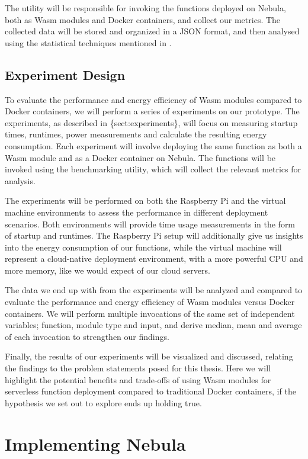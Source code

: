 \documentclass[
  table]{report}
\begin{document}
The utility will be responsible for invoking the functions deployed on
Nebula, both as \ac{Wasm} modules and Docker containers, and collect our
metrics. The collected data will be stored and organized in a JSON
format, and then analysed using the statistical techniques mentioned in
.

\section{Experiment Design}

To evaluate the performance and energy efficiency of \ac{Wasm} modules
compared to Docker containers, we will perform a series of experiments
on our prototype. The experiments, as described in \{sect:experiments\},
will focus on measuring startup times, runtimes, power measurements and
calculate the resulting energy consumption. Each experiment will involve
deploying the same function as both a \ac{Wasm} module and as a Docker
container on Nebula. The functions will be invoked using the
benchmarking utility, which will collect the relevant metrics for
analysis.

The experiments will be performed on both the Raspberry Pi and the
virtual machine environments to assess the performance in different
deployment scenarios. Both environments will provide time usage
measurements in the form of startup and runtimes. The Raspberry Pi setup
will additionally give us insights into the energy consumption of our
functions, while the virtual machine will represent a cloud-native
deployment environment, with a more powerful CPU and more memory, like
we would expect of our cloud servers.

The data we end up with from the experiments will be analyzed and
compared to evaluate the performance and energy efficiency of \ac{Wasm}
modules versus Docker containers. We will perform multiple invocations
of the same set of independent variables; function, module type and
input, and derive median, mean and average of each invocation to
strengthen our findings.

Finally, the results of our experiments will be visualized and
discussed, relating the findings to the problem statements posed for
this thesis. Here we will highlight the potential benefits and
trade-offs of using \ac{Wasm} modules for serverless function deployment
compared to traditional Docker containers, if the hypothesis we set out
to explore ends up holding true.

\chapter{Implementing Nebula}
\label{chap:implement}
\end{document}
